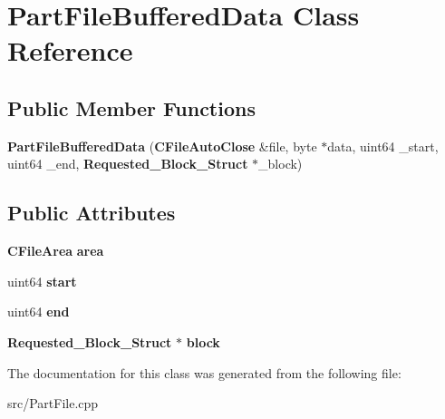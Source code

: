 \section{PartFileBufferedData Class Reference}
\label{classPartFileBufferedData}
\subsection*{Public Member Functions}
\begin{DoxyCompactItemize}
\item 
{\bfseries PartFileBufferedData} ({\bf CFileAutoClose} \&file, byte $\ast$data, uint64 \_\-start, uint64 \_\-end, {\bf Requested\_\-Block\_\-Struct} $\ast$\_\-block)\label{classPartFileBufferedData_ab2d68b7a307913b52b979aaec169f54b}

\end{DoxyCompactItemize}
\subsection*{Public Attributes}
\begin{DoxyCompactItemize}
\item 
{\bf CFileArea} {\bfseries area}\label{classPartFileBufferedData_a9560ec37354b2c3ec3066fda0b5685fa}

\item 
uint64 {\bfseries start}\label{classPartFileBufferedData_a945f20e82e92598d2087a3b97e9d5c40}

\item 
uint64 {\bfseries end}\label{classPartFileBufferedData_afabceb5dbc8565b31892f6f0c612f5e5}

\item 
{\bf Requested\_\-Block\_\-Struct} $\ast$ {\bfseries block}\label{classPartFileBufferedData_ab26b9f8d5b4d0dc92287b98b7ca211f1}

\end{DoxyCompactItemize}


The documentation for this class was generated from the following file:\begin{DoxyCompactItemize}
\item 
src/PartFile.cpp\end{DoxyCompactItemize}
